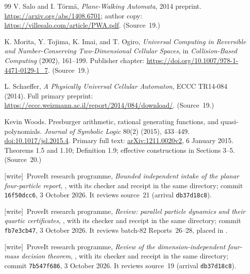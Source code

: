 \documentclass[11pt,letterpaper]{article}
\numberwithin{equation}{section}
\theoremstyle{definition}
\theoremstyle{remark}
\newcommand{\wtag}{\textup{[write]}}
\begin{document}
\begin{thebibliography}{99}
V. Salo and I. T\"orm\"a, \emph{Plane-Walking Automata}, 2014 preprint. \url{https://arxiv.org/abs/1408.6701}; author copy: \url{https://villesalo.com/article/PWA.pdf}.
(Source~19.)

K. Morita, Y. Tojima, K. Imai, and T. Ogiro, \emph{Universal Computing in Reversible and Number-Conserving Two-Dimensional Cellular Spaces}, in \emph{Collision-Based Computing} (2002), 161--199. Publisher chapter: \url{https://doi.org/10.1007/978-1-4471-0129-1_7}.
(Source~19.)

L. Schaeffer, \emph{A Physically Universal Cellular Automaton}, ECCC TR14-084 (2014). Full primary preprint: \url{https://eccc.weizmann.ac.il/report/2014/084/download/}.
(Source~19.)

Kevin Woods. Presburger arithmetic, rational generating functions, and quasi-polynomials. \emph{Journal of Symbolic Logic} 80(2) (2015), 433--449. \href{https://doi.org/10.1017/jsl.2015.4}{doi:10.1017/jsl.2015.4}. Primary full text: \href{https://arxiv.org/abs/1211.0020}{arXiv:1211.0020v2}, 6 January 2015. Theorems 1.5 and 1.10; Definition 1.9; effective constructions in Sections 3--5.
(Source~20.)

\wtag\ ProveIt research programme, \emph{Bounded independent intake of the planar four-particle report}, , with its checker and receipt in the same directory; commit \texttt{16f50dcc6}, 3 October 2026. It reviews source~21 (arrival \texttt{db37d18c8}).

\wtag\ ProveIt research programme, \emph{Review: parallel particle dynamics and their quartic certificates}, , with its checker and receipt in the same directory; commit \texttt{fb7e3cb47}, 3 October 2026. It reviews batch-82 Reports~26--28, placed in .

\wtag\ ProveIt research programme, \emph{Review of the dimension-independent four-mass decision theorem}, , with its checker and receipt in the same directory; commit \texttt{7b547f686}, 3 October 2026. It reviews source~19 (arrival \texttt{db37d18c8}).


\end{thebibliography}
\end{document}
